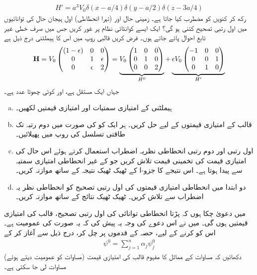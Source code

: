 \begin{align*}
H' = a^3 V_0 \delta (x - a/4) \delta (y - a/2) \delta (z - 3a/4)
\end{align*}
 رکھ کر کنویں کو مضطرب کیا جاتا ہے۔ زمینی حال اور (تہرا انحطاطی) اول ہیجان حال کی توانائیوں میں اول رتبی تصحیح کتنی ہو گی؟
ایک ایسے کوانٹائی نظام پر غور کریں جس میں صرف  خطی غیر تابع احوال پائے جاتے ہوں۔ فرض کریں قالبی روپ میں اس کا ہیملٹنی درج ذیل ہے
\begin{align*}
\operatorname{\mathbf{H}} = V_0 
\begin{pmatrix}
(1 - \epsilon) & 0 & 0 \\
0 & 1 & \epsilon \\
0 & \epsilon & 2
\end{pmatrix}
= \underbrace{V_0 
\begin{pmatrix}
1 & 0 & 0 \\
0 & 1 & 0 \\
0 & 0 & 2
\end{pmatrix}}_{H^0} 
+ \underbrace{\epsilon V_0 
\begin{pmatrix}
-1 & 0 & 0 \\
0 & 0 & 1 \\
0 & 1 & 0
\end{pmatrix}}_{H'}
\end{align*}
جہاں  ایک مستقل ہے، اور  کوئی چھوٹا عدد  ہے۔
\begin{enumerate}[a.]
\item
{} ہیملٹنی  کے امتیازی سمتیات اور امتیازی قیمتیں لکھیں۔
\item
قالب  کے  امتیازی قیمتوں  کے لیے حل کریں۔ ہر ایک کو  کی صورت میں دوم رتبہ تک طاقتی تسلسل کی روپ میں پھیلائیں۔ 
\item
اول رتبی اور دوم رتبی  انحطاطی نظریہ اضطراب استعمال کرتے ہوئے اس حال کی امتیازی قیمت کی تخمینی قیمت تلاش کریں جو  کے غیر انحطاطی امتیازی سمتیہ سے پیدا ہوتا ہے۔ اس نتیجے کا جزو-ا کے ٹھیک ٹھیک نتیجہ کے ساتھ موازنہ کریں۔
\item
دو ابتدا میں انحطاطی امتیازی قیمتوں کی اول رتبی تصحیح کو انحطاطی نظر یہ اضطراب سے تلاش کریں۔ ٹھیک ٹھیک نتائج کے ساتھ موازنہ کریں۔ 
\end{enumerate}
میں دعویٰ چکا ہوں کہ  پڑتا انحطاطی توانائی کی اول رتبی تصحیح، قالب  کی امتیازی قیمتیں  ہوں گی۔ میں نے اس دعوے کی وجہ یہ پیش کی کہ یہ  صورت کی  عمومیت ہے۔ اس کو  کرنے کے لیے، حصہ  کے قدموں پر چل کر، درج ذیل سے آغاز کر کے
\begin{align*}
\psi^0 = \sum_{j = 1}^n \alpha_j \psi_j^0
\end{align*}
(مساوات  کو عمومیت دیتے ہوئے) دکھائیں کہ مساوات  کے مماثل کا مفہوم قالب  کی امتیازی قیمت مساوات لی جا سکتی ہے۔ 


